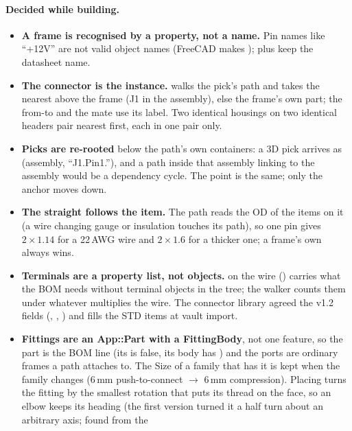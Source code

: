 \paragraph{Decided while building.}
\begin{itemize}[nosep]
  \item \textbf{A frame is recognised by a property, not a name.} Pin names like ``+12V'' are not valid object
        names (FreeCAD makes );  plus  keep the datasheet name.
  \item \textbf{The connector is the instance.}  walks the pick's path and takes the nearest
         above the frame (J1 in the assembly), else the frame's own part; the from-to and the mate
        use its label. Two identical housings on two identical headers pair nearest first, each in one pair only.
  \item \textbf{Picks are re-rooted} below the path's own containers: a 3D pick arrives as (assembly,
        ``J1.Pin1.''), and a path inside that assembly linking to the assembly would be a dependency cycle. The
        point is the same; only the anchor moves down.
  \item \textbf{The straight follows the item.} The path reads the OD of the items on it (a wire changing gauge or
        insulation touches its path), so one pin gives $2\times1.14$ for a 22\,AWG wire and $2\times1.6$ for a
        thicker one; a frame's own  always wins.
  \item \textbf{Terminals are a property list, not objects.}  on the wire
        () carries what the BOM needs without terminal objects in the tree; the
        walker counts them under whatever multiplies the wire. The connector library agreed the v1.2 fields
        (, , ) and fills the STD items at vault import.
  \item \textbf{Fittings are an App::Part with a FittingBody}, not one feature, so the part is the BOM line (its
         is false, its body has ) and the ports are ordinary frames a path attaches
        to. The Size of a family that has it is kept when the family changes (6\,mm push-to-connect $\to$ 6\,mm
        compression). Placing turns the fitting by the smallest rotation that puts its thread on the face, so an
        elbow keeps its heading (the first version turned it a half turn about an arbitrary axis; found from the

\end{itemize}
